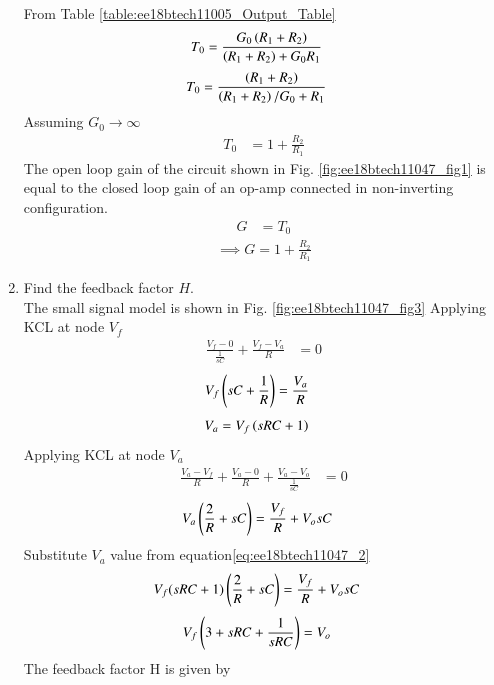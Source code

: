 \begin{enumerate}[label=\arabic*.,ref=\theenumi]
From Table \ref{table:ee18btech11005_Output_Table}
\begin{align}
T_{0} &= \frac{G_{0}\left(R_1+R_2\right)}{\left(R_1+R_2\right)+G_{0}R_1}
\end{align}
\begin{align}
T_{0} &= \frac{\left(R_1+R_2\right)}{\left(R_1+R_2\right)/G_{0}+R_1}
\end{align}
Assuming $G_{0}\to\infty$
\begin{align}
T_{0} &= 1 + \frac{R_{2}}{R_{1}}
\end{align}
The open loop gain of the circuit shown in Fig. \ref{fig:ee18btech11047_fig1} is equal to the closed loop gain of an op-amp connected in non-inverting configuration.
\begin{align}
G &= T_{0}
\end{align}
\begin{align}
\label{eq:ee18btech11047_1}
\implies G = 1 + \frac{R_{2}}{R_{1}}
\end{align}
%
\item Find the feedback factor $H$. \\
\label{prob:ee18btech11047_H}
\solution The small signal model is shown in Fig. \ref{fig:ee18btech11047_fig3}
Applying KCL at node $V_f$
\begin{align}
\frac{V_{f} - 0}{\frac{1}{sC}} +\frac{V_{f} - V_{a}}{R} &= 0
\end{align}
\begin{align}
V_{f}\left(sC+\frac{1}{R}\right) &= \frac{V_{a}}{R} 
\end{align}
\begin{align}
\label{eq:ee18btech11047_2}
V_{a} &= V_{f}\brak{sRC + 1} 
\end{align}
Applying KCL at node $V_{a}$
\begin{align}
\frac{V_{a} - V_{f}}{R} + \frac{V_{a} - 0}{R} + \frac{V_{a} - V_{o}}{\frac{1}{sC}} &= 0
\end{align}
\begin{align}
V_{a}\left(\frac{2}{R} +sC\right) &= \frac{V_{f}}{R} + V_{o}sC
\end{align}
Substitute $V_{a}$ value from equation\eqref{eq:ee18btech11047_2}
\begin{align}
V_{f}(sRC + 1)\left(\frac{2}{R} + sC\right) &= \frac{V_{f}}{R} + V_{o}sC
\end{align}
\begin{align}
V_{f}\left(3 + sRC + \frac{1}{sRC}\right) &= V_{o}
\end{align}
The feedback factor H is given by 
\begin{align}

\end{align}
\end{enumerate}
